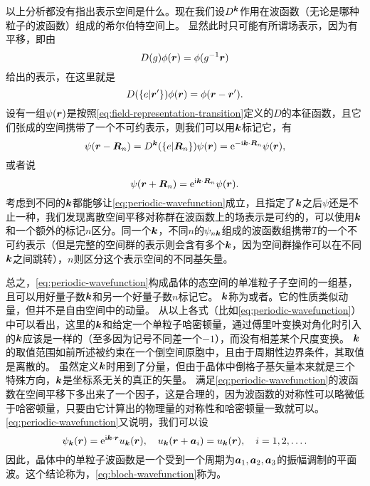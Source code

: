 以上分析都没有指出表示空间是什么。现在我们设$D^{\vb*{k}}$作用在波函数（无论是哪种粒子的波函数）组成的希尔伯特空间上。
显然此时只可能有所谓场表示，因为有平移，即由
\[
    D(g) \phi(\vb*{r}) = \phi(g^{-1} \vb*{r})
\]
给出的表示，在这里就是
\begin{equation}
    D(\{e | \vb*{r}' \}) \phi(\vb*{r}) = \phi(\vb*{r} - \vb*{r}'). 
    \label{eq:field-representation-transition}
\end{equation}
设有一组$\psi(\vb*{r})$是按照\eqref{eq:field-representation-transition}定义的$D$的本征函数，且它们张成的空间携带了一个不可约表示，则我们可以用$\vb*{k}$标记它，有
\begin{equation}
    \psi(\vb*{r} - \vb*{R}_n) = D^{\vb*{k}}(\{e | \vb*{R}_n \}) \psi(\vb*{r}) = \mathrm{e}^{- \mathrm{i} \vb*{k} \cdot \vb*{R}_n} \psi(\vb*{r}),
\end{equation}
或者说
\begin{equation}
    \psi(\vb*{r}+\vb*{R}_n) = \mathrm{e}^{\mathrm{i} \vb*{k} \cdot \vb*{R}_n} \psi(\vb*{r}).
    \label{eq:periodic-wavefunction}
\end{equation}
考虑到不同的$\vb*{k}$都能够让\eqref{eq:periodic-wavefunction}成立，且指定了$\vb*{k}$之后$\psi$还是不止一种，我们发现离散空间平移对称群在波函数上的场表示是可约的，可以使用$\vb*{k}$和一个额外的标记$n$区分。同一个$\vb*{k}$，不同$n$的$\psi_{n \vb*{k}}$组成的波函数组携带$T$的一个不可约表示（但是完整的空间群的表示则会含有多个$\vb*{k}$，因为空间群操作可以在不同$\vb*{k}$之间跳转），$n$则区分这个表示空间的不同基矢量。

总之，\eqref{eq:periodic-wavefunction}构成晶体的态空间的单准粒子子空间的一组基，且可以用好量子数$\vb*{k}$和另一个好量子数$n$标记它。
$\vb*{k}$称为或者。它的性质类似动量，但并不是自由空间中的动量。
从以上各式（比如\eqref{eq:periodic-wavefunction}）中可以看出，这里的$\vb*{k}$和给定一个单粒子哈密顿量，通过傅里叶变换对角化时引入的$\vb*{k}$应该是一样的（至多因为记号不同差一个$-1$），而没有相差某个尺度变换。
$\vb*{k}$的取值范围如前所述被约束在一个倒空间原胞中，且由于周期性边界条件，其取值是离散的。
虽然定义$\vb*{k}$时用到了分量，但由于晶体中倒格子基矢量本来就是三个特殊方向，$\vb*{k}$是坐标系无关的真正的矢量。
满足\eqref{eq:periodic-wavefunction}的波函数在空间平移下多出来了一个因子，这是合理的，因为波函数的对称性可以略微低于哈密顿量，只要由它计算出的物理量的对称性和哈密顿量一致就可以。
\eqref{eq:periodic-wavefunction}又说明，我们可以设
\begin{equation}
    \psi_{\vb*{k}}(\vb*{r}) = \mathrm{e}^{\mathrm{i} \vb*{k} \cdot \vb*{r}} u_{\vb*{k}}(\vb*{r}), \quad u_{\vb*{k}}(\vb*{r}+\vb*{a}_i) = u_{\vb*{k}}(\vb*{r}), \quad i = 1, 2, \ldots.
    \label{eq:bloch-wavefunction}
\end{equation}
因此，晶体中的单粒子波函数是一个受到一个周期为$\vb*{a}_1,\vb*{a}_2, \vb*{a}_3$的振幅调制的平面波。这个结论称为，\eqref{eq:bloch-wavefunction}称为。

